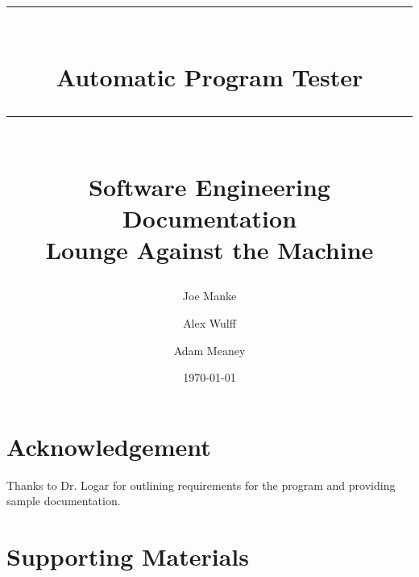 \documentclass[oneside]{book}
\title{{\color{MSBlue1} \rule{\linewidth}{0.5mm}}\\[2mm] {\huge \bfseries \color{MSBlue1} Automatic Program Tester }\\[-1mm] {\color{MSBlue1}\rule{\linewidth}{0.5mm}} \\  \vfill
{\LARGE \bfseries \color{MSBlue2} Software Engineering Documentation }\\  \vfill 
{\color{MSBlue1} Lounge Against the Machine} }
\author{\color{MSBlue1}  Joe Manke \and \color{MSBlue1} Alex Wulff \and  \color{MSBlue1} Adam Meaney }
\date{\color{MSBlue1} \today}
\begin{document}
\frontmatter
\maketitle

\tableofcontents
\listoffigures
\listofalgorithms


 
\mainmatter












\backmatter
\chapter{Acknowledgement}
\label{SpecialThanks}  Thanks  to Dr. Logar for outlining requirements for the program and providing sample documentation. 


\chapter{Supporting Materials}
\setcounter{section}{0}


\end{document}
